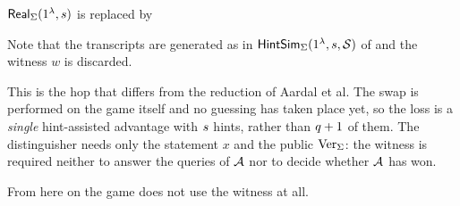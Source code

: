 $\mathsf{Real}_\Sigma(1^{\lambda}, s)$ is replaced by

Note that the transcripts are generated as in $\mathsf{HintSim}_\Sigma(1^{\lambda}, s, \operatorname{\mathcal{S}})$ of  and the witness $w$ is discarded.

This is the hop that differs from the reduction of Aardal et al. The swap is
performed on the \EUFCMA game itself and no guessing has taken place yet, so
the loss is a \emph{single} hint-assisted \wHVZK advantage with
$s$ hints, rather than $q + 1$ of them. The distinguisher needs
only the statement $x$ and the public $\operatorname{Ver}_\Sigma$: the witness is required
neither to answer the queries of $\mathcal{A}$ nor to decide whether $\mathcal{A}$ has won.

From here on the game does not use the witness at all.
